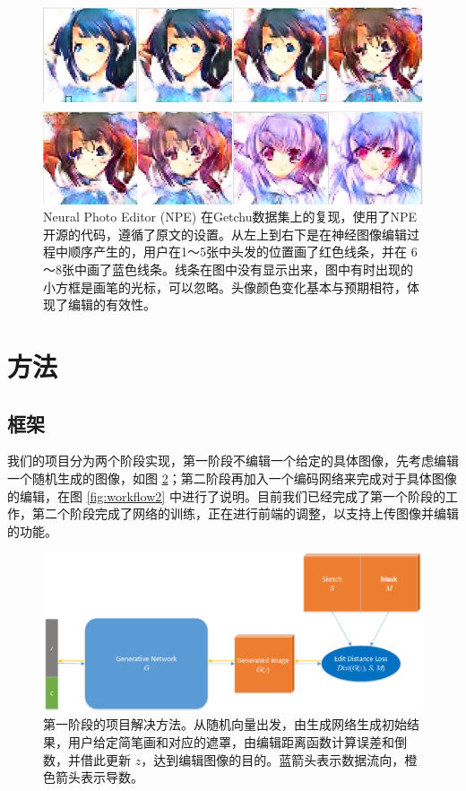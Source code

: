 \documentclass[a4paper,12pt,UTF8]{ctexart}
\newcommand{\kai}{\CJKfamily{zhkai}}	%
\begin{document}
\begin{figure}[H]
  \centering
  \includegraphics[width=0.9\linewidth]{figs/baseline2.PNG}
  \caption{\kai Neural Photo Editor (NPE) 在Getchu数据集上的复现，使用了NPE开源的代码，遵循了原文的设置。从左上到右下是在神经图像编辑过程中顺序产生的，用户在1～5张中头发的位置画了红色线条，并在 6～8张中画了蓝色线条。线条在图中没有显示出来，图中有时出现的小方框是画笔的光标，可以忽略。头像颜色变化基本与预期相符，体现了编辑的有效性。}
  \label{fig:baseline2}
\end{figure}

\section{方法}

\subsection{框架}

我们的项目分为两个阶段实现，第一阶段不编辑一个给定的具体图像，先考虑编辑一个随机生成的图像，如图 \ref{fig:workflow1}；第二阶段再加入一个编码网络来完成对于具体图像的编辑，在图 \ref{fig:workflow2} 中进行了说明。目前我们已经完成了第一个阶段的工作，第二个阶段完成了网络的训练，正在进行前端的调整，以支持上传图像并编辑的功能。

\begin{figure}[H]
  \centering
  \includegraphics[width=1\linewidth]{figs/workflow1.png}
  \caption{\kai 第一阶段的项目解决方法。从随机向量出发，由生成网络生成初始结果，用户给定简笔画和对应的遮罩，由编辑距离函数计算误差和倒数，并借此更新 $z$，达到编辑图像的目的。蓝箭头表示数据流向，橙色箭头表示导数。}
  \label{fig:workflow1}
\end{figure}
\end{document}
